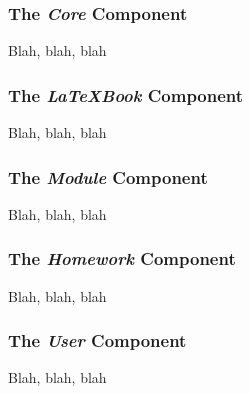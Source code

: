 	\subsubsection{The \textit{Core} Component}
		Blah, blah, blah
	
	\subsubsection{The \textit{LaTeXBook} Component}
		Blah, blah, blah
	
	\subsubsection{The \textit{Module} Component}
		Blah, blah, blah
	
	\subsubsection{The \textit{Homework} Component}
		Blah, blah, blah
		
	\subsubsection{The \textit{User} Component}
		Blah, blah, blah